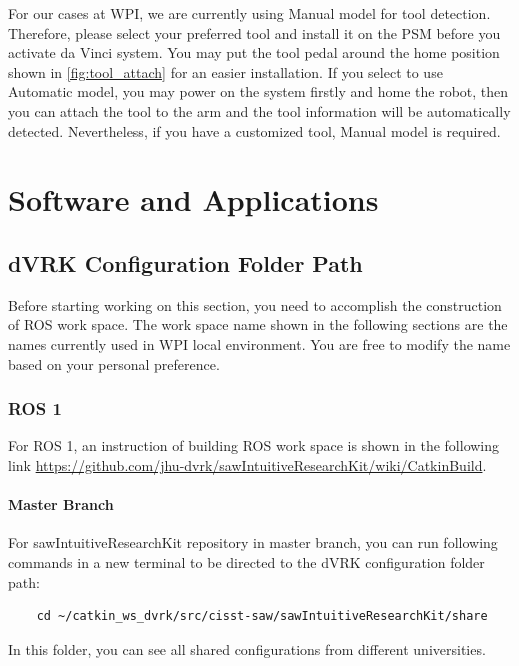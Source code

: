 For our cases at WPI, we are currently using Manual model for tool detection. Therefore, please select your preferred tool and install it on the PSM before you activate da Vinci system. You may put the tool pedal around the home position shown in \autoref{fig:tool_attach} for an easier installation. If you select to use Automatic model, you may power on the system firstly and home the robot, then you can attach the tool to the arm and the tool information will be automatically detected. Nevertheless, if you have a customized tool, Manual model is required.

\newpage

\chapter{Software and Applications}
\label{ch: Software}

\section{dVRK Configuration Folder Path}

Before starting working on this section, you need to accomplish the construction of ROS work space. The work space name shown in the following sections are the names currently used in WPI local environment. You are free to modify the name based on your personal preference.

\subsection{ROS 1}

For ROS 1, an instruction of building ROS work space is shown in the following link \url{https://github.com/jhu-dvrk/sawIntuitiveResearchKit/wiki/CatkinBuild}.

\subsubsection{Master Branch}

For sawIntuitiveResearchKit repository in master branch, you can run following commands in a new terminal to be directed to the dVRK configuration folder path:

\begin{verbatim}
    cd ~/catkin_ws_dvrk/src/cisst-saw/sawIntuitiveResearchKit/share
\end{verbatim}

In this folder, you can see all shared configurations from different universities. 

